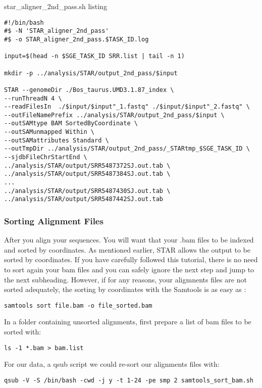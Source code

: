 \noindent star\_aligner\_2nd\_pass.sh listing
\begin{verbatim}
#!/bin/bash
#$ -N 'STAR_aligner_2nd_pass'
#$ -o STAR_aligner_2nd_pass.$TASK_ID.log

input=$(head -n $SGE_TASK_ID SRR.list | tail -n 1)

mkdir -p ../analysis/STAR/output_2nd_pass/$input

STAR --genomeDir ./Bos_taurus.UMD3.1.87_index \
--runThreadN 4 \
--readFilesIn  ./$input/$input"_1.fastq" ./$input/$input"_2.fastq" \
--outFileNamePrefix ../analysis/STAR/output_2nd_pass/$input \
--outSAMtype BAM SortedByCoordinate \
--outSAMunmapped Within \
--outSAMattributes Standard \
--outTmpDir ../analysis/STAR/output_2nd_pass/_STARtmp_$SGE_TASK_ID \
--sjdbFileChrStartEnd \
../analysis/STAR/output/SRR5487372SJ.out.tab \
../analysis/STAR/output/SRR5487384SJ.out.tab \
...
../analysis/STAR/output/SRR5487430SJ.out.tab \
../analysis/STAR/output/SRR5487442SJ.out.tab
\end{verbatim}



\subsubsection{Sorting Alignment Files}


After you align your sequences. You will want that your .bam files to be indexed and sorted by coordinates. As mentioned earlier, STAR allows the output to be sorted by coordinates. If you have carefully followed this tutorial, there is no need to sort again your bam files and you can safely ignore the next step and jump to the next subheading. However, if for any reasons, your aligmnents files are not sorted adequately, the sorting by coordinates with the Samtools is as easy as :

\begin{verbatim}
samtools sort file.bam -o file_sorted.bam
\end{verbatim}

In a folder containing unsorted alignments, first prepare a list of bam files to be sorted with:

\begin{verbatim}
ls -1 *.bam > bam.list
\end{verbatim}

For our data, a qsub script we could re-sort our alignments files with:


\begin{verbatim}
qsub -V -S /bin/bash -cwd -j y -t 1-24 -pe smp 2 samtools_sort_bam.sh
\end{verbatim}

